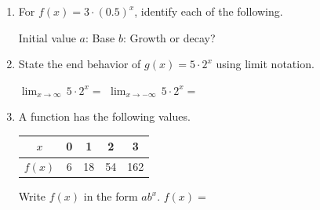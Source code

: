 \documentclass[10pt]{article}
\begin{document}
\namedateperiod

\vspace{0.16in}

\begin{enumerate}[itemsep=18pt]

\item For $f(x) = 3 \cdot (0.5)^x$, identify each of the following.

      \medskip
      Initial value $a$: \blank{3cm} \quad
      Base $b$: \blank{3cm} \quad
      Growth or decay? \blank{3cm}

\item State the end behavior of $g(x) = 5 \cdot 2^x$ using limit notation.

      \medskip
      $\displaystyle\lim_{x \to \infty}\, 5 \cdot 2^x = $ \blank{3cm}
      \qquad
      $\displaystyle\lim_{x \to -\infty}\, 5 \cdot 2^x = $ \blank{3cm}

\item A function has the following values.

      \renewcommand{\arraystretch}{1.4}
      \begin{tabular}{|c|c|c|c|c|}
        \hline
        $x$    & 0 & 1  & 2  & 3   \\
        \hline
        $f(x)$ & 6 & 18 & 54 & 162 \\
        \hline
      \end{tabular}

      \vspace{0.08in}
      Write $f(x)$ in the form $ab^x$. \quad $f(x) = $ \blank{6cm}

\end{enumerate}
\end{document}
